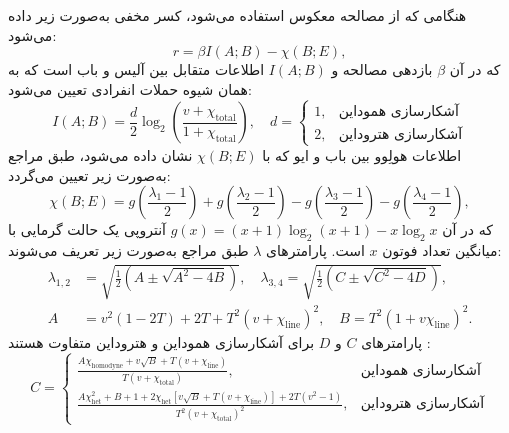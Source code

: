 هنگامی که از مصالحه معکوس استفاده می‌شود، کسر مخفی به‌صورت زیر داده می‌شود:
\begin{equation}
	r = \beta I(A; B) - \chi(B; E),
	\label{eq:7-140}
\end{equation}
که در آن $\beta$ بازدهی مصالحه و $I(A; B)$ اطلاعات متقابل بین آلیس و باب است که به همان شیوه حملات انفرادی تعیین می‌شود:
\begin{equation}
	I(A; B) = \frac{d}{2} \log_2 \left( \frac{v + \chi_{\text{total}}}{1 + \chi_{\text{total}}} \right), \quad d = \begin{cases} 1, & \text{آشکارسازی هموداین} \\ 2, & \text{آشکارسازی هتروداین} \end{cases}
	\label{eq:7-141}
\end{equation}
اطلاعات هولِوو بین باب و ایو که با $\chi(B; E)$ نشان داده می‌شود، طبق مراجع \cite{7-90, 7-103, 7-104} به‌صورت زیر تعیین می‌گردد:
\begin{equation}
	\chi(B; E) = g\left(\frac{\lambda_1 - 1}{2}\right) + g\left(\frac{\lambda_2 - 1}{2}\right) - g\left(\frac{\lambda_3 - 1}{2}\right) - g\left(\frac{\lambda_4 - 1}{2}\right),
	\label{eq:7-142}
\end{equation}
که در آن $g(x) = (x + 1)\log_2(x + 1) - x\log_2 x$ آنتروپی یک حالت گرمایی با میانگین تعداد فوتون $x$ است. پارامترهای $\lambda$ طبق مراجع \cite{7-90, 7-108} به‌صورت زیر تعریف می‌شوند:
\begin{equation}
	\begin{aligned}
		\lambda_{1,2} &= \sqrt{\frac{1}{2} (A \pm \sqrt{A^2 - 4B})}, \quad \lambda_{3,4} = \sqrt{\frac{1}{2} (C \pm \sqrt{C^2 - 4D})}, \\
		A &= v^2(1 - 2T) + 2T + T^2(v + \chi_{\text{line}})^2, \quad B = T^2(1 + v\chi_{\text{line}})^2.
	\end{aligned}
	\label{eq:7-143}
\end{equation}
پارامترهای $C$ و $D$ برای آشکارسازی هموداین و هتروداین متفاوت هستند \cite{7-90, 7-108}:
\begin{equation}
	C = \begin{cases} 
		\frac{A\chi_{\text{homodyne}} + v\sqrt{B} + T(v + \chi_{\text{line}})}{T(v + \chi_{\text{total}})}, & \text{آشکارسازی هموداین} \\ 
		\frac{A\chi_{\text{het}}^2 + B + 1 + 2\chi_{\text{het}}[v\sqrt{B} + T(v + \chi_{\text{line}})] + 2T(v^2 - 1)}{T^2(v + \chi_{\text{total}})^2}, & \text{آشکارسازی هتروداین}
	\end{cases}
	\label{eq:7-144}
\end{equation}
